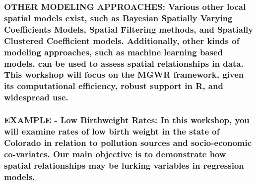 \documentclass[
  12pt,
]{article}
\begin{document}
\hypertarget{other-modeling-approaches-various-other-local-spatial-models-exist-such-as-bayesian-spatially-varying-coefficients-models-spatial-filtering-methods-and-spatially-clustered-coefficient-models.-additionally-other-kinds-of-modeling-approaches-such-as-machine-learning-based-models-can-be-used-to-assess-spatial-relationships-in-data.-this-workshop-will-focus-on-the-mgwr-framework-given-its-computational-efficiency-robust-support-in-r-and-widespread-use.}{%
\subsubsection{OTHER MODELING APPROACHES: Various other local spatial
models exist, such as Bayesian Spatially Varying Coefficients Models,
Spatial Filtering methods, and Spatially Clustered Coefficient models.
Additionally, other kinds of modeling approaches, such as machine
learning based models, can be used to assess spatial relationships in
data. This workshop will focus on the MGWR framework, given its
computational efficiency, robust support in R, and widespread
use.}\label{other-modeling-approaches-various-other-local-spatial-models-exist-such-as-bayesian-spatially-varying-coefficients-models-spatial-filtering-methods-and-spatially-clustered-coefficient-models.-additionally-other-kinds-of-modeling-approaches-such-as-machine-learning-based-models-can-be-used-to-assess-spatial-relationships-in-data.-this-workshop-will-focus-on-the-mgwr-framework-given-its-computational-efficiency-robust-support-in-r-and-widespread-use.}}

\hypertarget{example---low-birthweight-rates-in-this-workshop-you-will-examine-rates-of-low-birth-weight-in-the-state-of-colorado-in-relation-to-pollution-sources-and-socio-economic-co-variates.-our-main-objective-is-to-demonstrate-how-spatial-relationships-may-be-lurking-variables-in-regression-models.}{%
\subsubsection{EXAMPLE - Low Birthweight Rates: In this workshop, you
will examine rates of low birth weight in the state of Colorado in
relation to pollution sources and socio-economic co-variates. Our main
objective is to demonstrate how spatial relationships may be lurking
variables in regression
models.}\label{example---low-birthweight-rates-in-this-workshop-you-will-examine-rates-of-low-birth-weight-in-the-state-of-colorado-in-relation-to-pollution-sources-and-socio-economic-co-variates.-our-main-objective-is-to-demonstrate-how-spatial-relationships-may-be-lurking-variables-in-regression-models.}}
\end{document}

